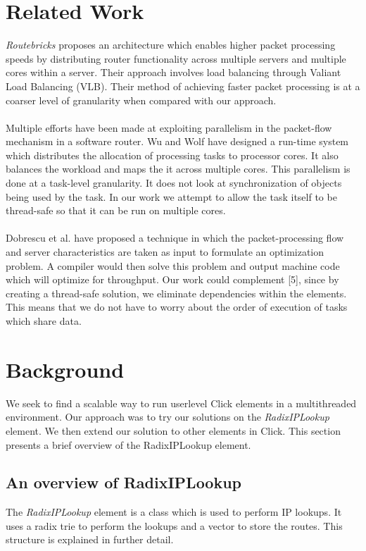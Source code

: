 \documentclass{article}
\begin{document}
\section{Related Work}
\emph{Routebricks} \cite{routebricks} proposes an architecture which enables higher packet processing speeds by distributing router functionality across multiple servers and multiple cores within a server. Their approach involves load balancing through Valiant Load Balancing (VLB). Their method of achieving faster packet processing is at a coarser level of granularity when compared with our approach.
\\\\ Multiple efforts have been made at exploiting parallelism in the packet-flow mechanism in a software router. Wu and Wolf \cite{runtimepacketprocessing} have designed a run-time system which distributes the allocation of processing tasks to processor cores. It also balances the workload and maps the it across multiple cores. This parallelism is done at a task-level granularity. It does not look at synchronization of objects being used by the task. In our work we attempt to allow the task itself to be thread-safe so that it can be run on multiple cores.
\\\\ Dobrescu et al. \cite{dobrescu} have proposed a technique in which the packet-processing flow and server characteristics are taken as input to formulate an optimization problem. A compiler would then solve this problem and output machine code which will optimize for throughput. Our work could complement [5], since by creating a thread-safe solution, we eliminate dependencies within the elements. This means that we do not have to worry about the order of execution of tasks which share data.

\section{Background}
\label{sec:background}
We seek to find a scalable way to run userlevel Click elements in a multithreaded environment. Our approach was to try our solutions on the \emph{RadixIPLookup} element. We then extend our solution to other elements in Click. This section presents a brief overview of the RadixIPLookup element.
\subsection{An overview of RadixIPLookup}
The \emph{RadixIPLookup} element \cite{radixiplookup} is a class which is used to perform IP lookups. It uses a radix trie to perform the lookups and a vector to store the routes. This structure is explained in further detail. 
\end{document}
